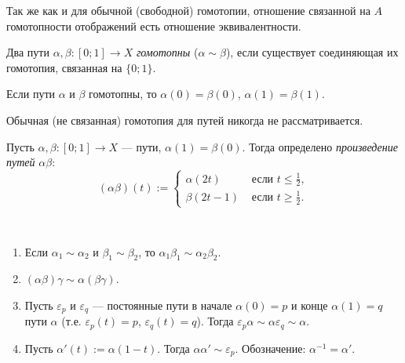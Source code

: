 \documentclass[12pt,a4paper]{article}
\begin{document}
    \begin{exercise}
        Так же как и для обычной (свободной) гомотопии, отношение связанной на $A$ гомотопности отображений есть отношение эквивалентности.
    \end{exercise}

    \begin{definition}
        Два пути $\alpha, \beta: [0; 1] \to X$ \emph{гомотопны} ($\alpha \sim \beta$), если существует соединяющая их гомотопия, связанная на $\{0; 1\}$.
    \end{definition}

    \begin{remark*}
        Если пути $\alpha$ и $\beta$ гомотопны, то $\alpha(0) = \beta(0)$, $\alpha(1) = \beta(1)$.
    \end{remark*}

    \begin{remark*}
        Обычная (не связанная) гомотопия для путей никогда не рассматривается.
    \end{remark*}

    \begin{definition}
        Пусть $\alpha, \beta: [0; 1] \to X$ --- пути, $\alpha(1) = \beta(0)$. Тогда определено \emph{произведение путей} $\alpha\beta$:
        \[
            (\alpha\beta)(t) :=
            \begin{cases}
                \alpha(2t)& \text{ если } t \leqslant \frac{1}{2},\\
                \beta(2t-1)& \text{ если } t \geqslant \frac{1}{2}.
            \end{cases}
        \]
    \end{definition}

    \begin{lemma}\ 
        \begin{enumerate}
            \item Если $\alpha_1 \sim \alpha_2$ и $\beta_1 \sim \beta_2$, то $\alpha_1 \beta_1 \sim \alpha_2 \beta_2$.
            \item $(\alpha\beta)\gamma \sim \alpha(\beta\gamma)$.
            \item Пусть $\varepsilon_p$ и $\varepsilon_q$ --- постоянные пути в начале $\alpha(0) = p$ и конце $\alpha(1) = q$ пути $\alpha$ (т.е. $\varepsilon_p(t) = p$, $\varepsilon_q(t) = q$). Тогда $\varepsilon_p \alpha \sim \alpha \varepsilon_q \sim \alpha$.
            \item Пусть $\alpha'(t) := \alpha(1-t)$. Тогда $\alpha\alpha' \sim \varepsilon_p$. Обозначение: $\alpha^{-1} = \alpha'$.
        \end{enumerate}
    \end{lemma}
\end{document}
